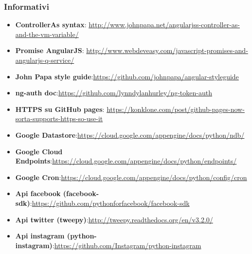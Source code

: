 		\subsubsection{Informativi} %
		\label{ssub:informativi}
			\begin{itemize}
				\item \textbf{ControllerAs syntax}: \newline	\url{http://www.johnpapa.net/angularjss-controller-as-and-the-vm-variable/}
				\item \textbf{Promise AngularJS}: \newline
\url{http://www.webdeveasy.com/javascript-promises-and-angularjs-q-service/}
				\item \textbf{John Papa style guide}:\newline \url{https://github.com/johnpapa/angular-styleguide}
				\item \textbf{ng-auth doc}:\newline \url{https://github.com/lynndylanhurley/ng-token-auth}
				\item \textbf{HTTPS su GitHub pages}:\newline
					\url{https://konklone.com/post/github-pages-now-sorta-supports-https-so-use-it}
				\item \textbf{Google Datastore}:\newline \url{https://cloud.google.com/appengine/docs/python/ndb/}
				\item \textbf{Google Cloud Endpoints}:\newline \url{https://cloud.google.com/appengine/docs/python/endpoints/}
				\item \textbf{Google Cron}:\newline \url{https://cloud.google.com/appengine/docs/python/config/cron}
				\item \textbf{Api facebook (facebook-sdk)}:\newline \url{https://github.com/pythonforfacebook/facebook-sdk}
				\item \textbf{Api twitter (tweepy)}:\newline \url{http://tweepy.readthedocs.org/en/v3.2.0/}
				\item \textbf{Api instagram (python-instagram)}:\newline \url{https://github.com/Instagram/python-instagram}
			\end{itemize}
